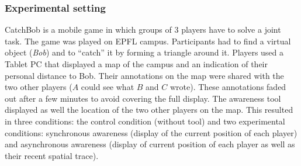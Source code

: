 \documentclass[natbib]{svjour3}
\begin{document}
\subsubsection*{Experimental setting}

{\sc CatchBob} is a mobile game in which groups of 3 players have to solve a
joint task. The game was played on EPFL campus. Participants had to find a
virtual object (\emph{Bob}) and to ``catch'' it by forming a triangle around it.
Players used a Tablet PC that displayed a map of the campus and an indication of
their personal distance to Bob. Their annotations on the map were shared with
the two other players ($A$ could see what $B$ and $C$ wrote). These annotations
faded out after a few minutes to avoid covering the full display. The awareness
tool displayed as well the location of the two other players on the map. This
resulted in three conditions: the control condition (without tool) and two
experimental conditions: synchronous awareness (display of the current position
of each player) and asynchronous awareness (display of current position of each
player as well as their recent spatial trace).
\end{document}
